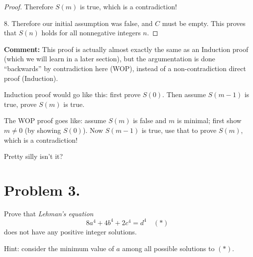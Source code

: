 \documentclass[14pt]{extarticle}
\begin{document}
\begin{proof}
Therefore $S(m)$ is true, which is a contradiction!

8. Therefore our initial assumption was false, and $C$ must be empty. This proves that $S(n)$ holds for all nonnegative integers $n$.
\end{proof}

\textbf{Comment:} This proof is actually almost exactly the same as an Induction proof (which we will learn in a later section), but the argumentation is done ``backwards'' by contradiction here (WOP), instead of a non-contradiction direct proof (Induction).

Induction proof would go like this: first prove $S(0)$. Then assume $S(m-1)$ is true, prove $S(m)$ is true.

The WOP proof goes like: assume $S(m)$ is false and $m$ is minimal; first show $m \neq 0$ (by showing $S(0)$). Now $S(m-1)$ is true, use that to prove $S(m)$, which is a contradiction!

Pretty silly isn't it?

\section{Problem 3.} 

Prove that \textit{Lehman's equation}
$$
8a^4 + 4b^4 + 2c^4 = d^4 \,\,\,\,\,\,(*)
$$
does not have any positive integer solutions.

Hint: consider the minimum value of $a$ among all possible solutions to $(*)$.
\end{document}
